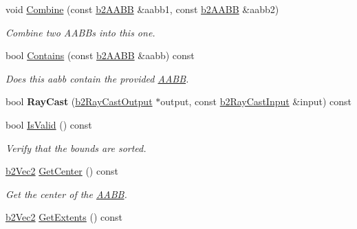 \begin{DoxyCompactItemize}
\mbox{\label{structb2AABB_a34b9c7d824df845c10caa9c12ae90452}} 
void \hyperlink{structb2AABB_a34b9c7d824df845c10caa9c12ae90452}{Combine} (const \hyperlink{structb2AABB}{b2\+A\+A\+BB} \&aabb1, const \hyperlink{structb2AABB}{b2\+A\+A\+BB} \&aabb2)
\begin{DoxyCompactList}\small\item\em Combine two A\+A\+B\+Bs into this one. \end{DoxyCompactList}\item 
\mbox{\label{structb2AABB_acf98175d3a53bca755d5c4852fa85a00}} 
bool \hyperlink{structb2AABB_acf98175d3a53bca755d5c4852fa85a00}{Contains} (const \hyperlink{structb2AABB}{b2\+A\+A\+BB} \&aabb) const
\begin{DoxyCompactList}\small\item\em Does this aabb contain the provided \hyperlink{classAABB}{A\+A\+BB}. \end{DoxyCompactList}\item 
\mbox{\label{structb2AABB_af6a8b26716ec07d326e5ce95556e8c7e}} 
bool {\bfseries Ray\+Cast} (\hyperlink{structb2RayCastOutput}{b2\+Ray\+Cast\+Output} $\ast$output, const \hyperlink{structb2RayCastInput}{b2\+Ray\+Cast\+Input} \&input) const
\item 
\mbox{\label{structb2AABB_a70bb45c086fcc2d7ee8694deb386070e}} 
bool \hyperlink{structb2AABB_a70bb45c086fcc2d7ee8694deb386070e}{Is\+Valid} () const
\begin{DoxyCompactList}\small\item\em Verify that the bounds are sorted. \end{DoxyCompactList}\item 
\mbox{\label{structb2AABB_a2c4051e79001a3166cc7f8ad811137fe}} 
\hyperlink{structb2Vec2}{b2\+Vec2} \hyperlink{structb2AABB_a2c4051e79001a3166cc7f8ad811137fe}{Get\+Center} () const
\begin{DoxyCompactList}\small\item\em Get the center of the \hyperlink{classAABB}{A\+A\+BB}. \end{DoxyCompactList}\item 
\mbox{\label{structb2AABB_a2a4f550a18d2a0895fbc5c4d3ec17d22}} 
\hyperlink{structb2Vec2}{b2\+Vec2} \hyperlink{structb2AABB_a2a4f550a18d2a0895fbc5c4d3ec17d22}{Get\+Extents} () const

\end{DoxyCompactItemize}
